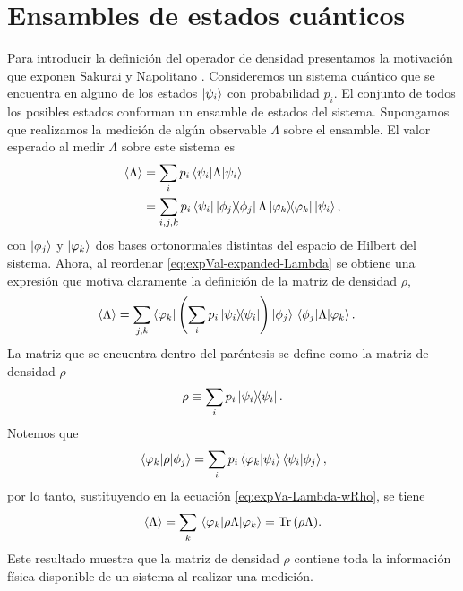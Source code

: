 \section{Ensambles de estados cuánticos} \label{sec:ensambles} %

Para introducir la definición del operador de densidad presentamos la 
motivación que exponen Sakurai y Napolitano \cite{sakurai_napolitano_2017}.
Consideremos un sistema cuántico que se encuentra en alguno de los estados 
$\ket{\psi_{i} }$ con probabilidad $p_i$. El conjunto de todos los posibles estados
conforman un ensamble de estados del sistema. Supongamos que realizamos 
la medición de algún observable $\Lambda$ sobre el ensamble. El 
valor esperado al medir $\Lambda$ sobre este sistema es
\begin{align}\label{eq:expVal-expanded-Lambda}
	\expval{\Lambda} &= \sum_i p_i \matrixel{\psii}{\Lambda}{\psii}\nonumber\\
	&= \sum_{i,j,k} p_i 
	\bra{\psii}\dyad{\phi_j}{\phi_j}\Lambda\dyad{\varphi_k}{\varphi_k}\Pk{i},
\end{align}
con $\ket{\phi_j}$ y $\ket{\varphi_k}$ dos bases ortonormales distintas del
espacio de Hilbert del sistema. Ahora, al reordenar 
\eqref{eq:expVal-expanded-Lambda} se obtiene una expresión 
que motiva claramente la definición de la matriz de densidad $\rho$,
\begin{align}\label{eq:expVa-Lambda-wRho}
	\expval{\Lambda}&= \sum _{j,k}\bra{\varphi_k}\qty(\sum_ip_i \dyad{\psii}{\psii} 
	)\ket{\phi_j}	\matrixel{\phi_j}{\Lambda}{\varphi_k}.
\end{align}
La matriz que se encuentra dentro del paréntesis se define como 
la matriz de densidad 
$\rho$~\cite{nielsen_chuang_2011, sakurai_napolitano_2017}
\begin{equation}
	\rho \equiv \sum _i p_i\dyad{\psi_i}{\psi_i}.
	\label{eq:rho_def}
\end{equation}
Notemos que 
\begin{align}
	\matrixel{\varphi_k}{\rho}{\phi_j} = 
	\sum_ip_i \braket{\varphi_k}{\psii}\braket{\psii}{\phi_j},
\end{align}
por lo tanto, sustituyendo en la ecuación \eqref{eq:expVa-Lambda-wRho},
se tiene
\begin{align}\label{eq:Tr(rhoLambda)}
	\expval{\Lambda}=\sum _k \matrixel{\varphi_k}{\rho \Lambda}{\varphi_k} 
	= \Tr \qty(\rho\Lambda).
\end{align} 
Este resultado muestra que la matriz de densidad $\rho$ 
contiene toda la información física disponible de un sistema al 
realizar una medición. 

